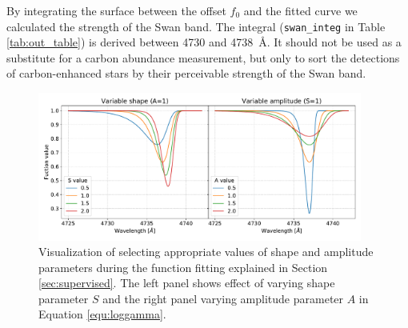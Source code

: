 By integrating the surface between the offset $f_0$ and the fitted curve we calculated the strength of the Swan band. The integral (\texttt{swan\_integ} in Table \ref{tab:out_table}) is derived between 4730 and 4738~\AA. It should not be used as a substitute for a carbon abundance measurement, but only to sort the detections of carbon-enhanced stars by their perceivable strength of the Swan band.

\begin{figure}
	\centering
	\includegraphics[width=0.95\textwidth]{variable_A_S.pdf}
	\caption{Visualization of selecting appropriate values of shape and amplitude parameters during the function fitting explained in Section \ref{sec:supervised}. The left panel shows effect of varying shape parameter $S$ and the right panel varying amplitude parameter $A$ in Equation \ref{equ:loggamma}.}
	\label{fig:varibles_loggamma}
\end{figure}

